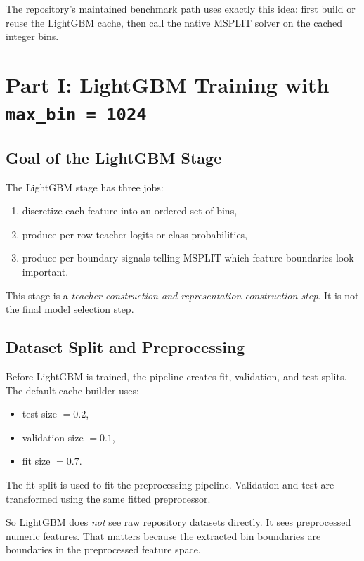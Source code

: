 \documentclass[11pt]{article}
\begin{document}
The repository's maintained benchmark path uses exactly this idea: first build or reuse the LightGBM cache, then call the native MSPLIT solver on the cached integer bins.

\section{Part I: LightGBM Training with \texttt{max\_bin = 1024}}

\subsection{Goal of the LightGBM Stage}

The LightGBM stage has three jobs:

\begin{enumerate}
\item discretize each feature into an ordered set of bins,
\item produce per-row teacher logits or class probabilities,
\item produce per-boundary signals telling MSPLIT which feature boundaries look important.
\end{enumerate}

This stage is a \emph{teacher-construction and representation-construction step}. It is not the final model selection step.

\subsection{Dataset Split and Preprocessing}

Before LightGBM is trained, the pipeline creates fit, validation, and test splits. The default cache builder uses:

\begin{itemize}
\item test size \(= 0.2\),
\item validation size \(= 0.1\),
\item fit size \(= 0.7\).
\end{itemize}

The fit split is used to fit the preprocessing pipeline. Validation and test are transformed using the same fitted preprocessor.

So LightGBM does \emph{not} see raw repository datasets directly. It sees preprocessed numeric features. That matters because the extracted bin boundaries are boundaries in the preprocessed feature space.
\end{document}
